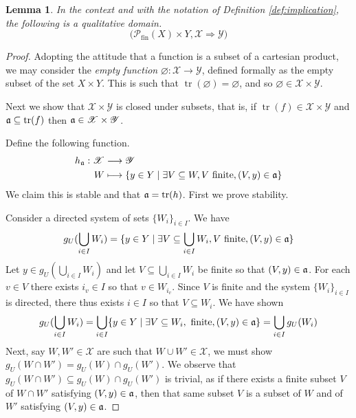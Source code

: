 \documentclass[12pt]{article}
\theoremstyle{plain}
\newtheorem{lemma}[thm]{Lemma}
\theoremstyle{definition}
\newcommand{\scr}[1]{\mathscr{#1}}
\newcommand{\call}[1]{\mathcal{#1}}
\newcommand{\lto}{\longrightarrow}
\begin{document}
	\begin{lemma}\label{lem:implication_qd}
		In the context and with the notation of Definition \ref{def:implication}, the following is a qualitative domain.
		\begin{equation}
			\big(\call{P}_{\text{fin}}(X) \times Y, \scr{X} \Rightarrow \scr{Y}\big)
			\end{equation}
		\end{lemma}
	\begin{proof}
		Adopting the attitude that a function is a subset of a cartesian product, we may consider the \emph{empty function} $\varnothing: \scr{X} \lto \scr{Y}$, defined formally as the empty subset of the set $X \times Y$. This is such that $\operatorname{tr}(\varnothing) = \varnothing$, and so $\varnothing \in \scr{X} \times \scr{Y}$.
		
		Next we show that $\scr{X} \times \scr{Y}$ is closed under subsets, that is, if $\operatorname{tr}(f) \in \scr{X} \times \scr{Y}$ and $\frak{a} \subseteq \operatorname{tr}(f)$ then $\frak{a} \in \scr{X} \times \scr{Y}$.
		
		Define the following function.
		\begin{align}
			\label{eq:subset}h_{\frak{a}}: \scr{X} &\lto \scr{Y}\\
			W &\longmapsto \{ y \in Y \mid \exists V \subseteq W, V \text{ finite}, (V, y) \in \frak{a} \}
			\end{align}
		We claim this is stable and that $\frak{a} =\operatorname{tr}(h)$. First we prove stability.
		
		Consider a directed system of sets $\{ W_i \}_{i \in I}$. We have
		\begin{equation}
			g_U(\bigcup_{i \in I}W_i) = \{ y \in Y \mid \exists V \subseteq \bigcup_{i \in I}W_i, V\text{ finite}, (V,y) \in \frak{a} \}
			\end{equation}
		Let $y \in g_U(\bigcup_{i \in I}W_i)$ and let $V \subseteq \bigcup_{i \in I}W_i$ be finite so that $(V,y) \in \frak{a}$. For each $v \in V$ there exists $i_v \in I$ so that $v \in W_{i_v}$. Since $V$ is finite and the system $\{ W_i \}_{i \in I}$ is directed, there thus exists $i \in I$ so that $V \subseteq W_i$. We have shown
		\begin{equation}
			g_U(\bigcup_{i \in I}W_i) = \bigcup_{i \in I}\{ y \in Y \mid \exists V \subseteq W_i,\text{ finite}, (V,y) \in \frak{a} \} = \bigcup_{i \in I}g_U(W_i)
			\end{equation}
		Next, say $W, W' \in \scr{X}$ are such that $W \cup W' \in \scr{X}$, we must show $g_U(W \cap W') = g_U(W) \cap g_U(W')$. We observe that $g_U(W \cap W') \subseteq g_U(W) \cap g_U(W')$ is trivial, as if there exists a finite subset $V$ of $W \cap W'$ satisfying $(V,y) \in \frak{a}$, then that same subset $V$ is a subset of $W$ and of $W'$ satisfying $(V,y) \in \frak{a}$.
		

\end{proof}
\end{document}
